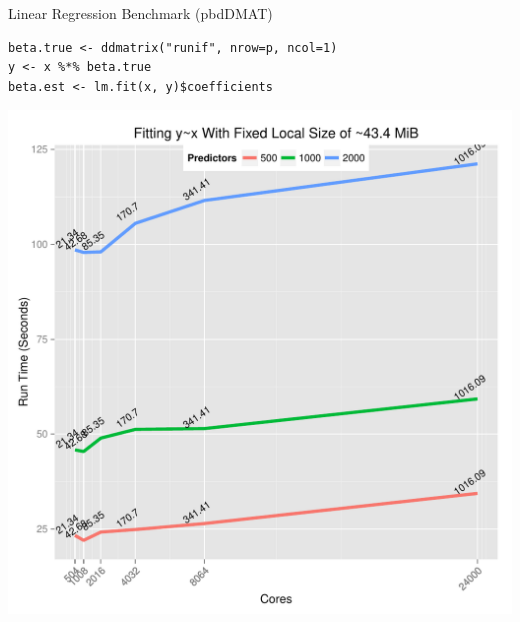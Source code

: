 \begin{frame}[fragile]
  \begin{block}{Linear Regression Benchmark (pbdDMAT)}
    \vspace{-3.5ex}\scriptsize
    \begin{lstlisting}
beta.true <- ddmatrix("runif", nrow=p, ncol=1)
y <- x %*% beta.true
beta.est <- lm.fit(x, y)$coefficients
    \end{lstlisting} %
    \vspace{-3ex}
    \begin{center}
      \includegraphics[trim=3mm 1mm 2mm
      11.2mm,clip,height=.77\textheight]{../common/pics/benchmarks/lmfit2}
    \end{center}
  \end{block}
\end{frame}

